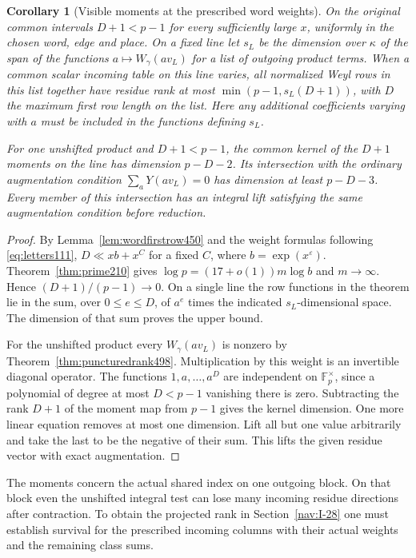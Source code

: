 \documentclass[a4paper,11pt]{article}
\newtheorem{corollary}[proposition]{Corollary}
\theoremstyle{definition}
\theoremstyle{remark}
\numberwithin{equation}{section}
\begin{document}
\begin{corollary}[Visible moments at the prescribed word weights]\leavevmode
\label{cor:orbitkernel500}
On the original common intervals \(D+1<p-1\) for every
sufficiently large \(x\), uniformly in the chosen word, edge
and place. On a fixed line let \(s_L\) be the dimension over
\(\kappa\) of the span of the functions
\(a\mapsto W_\gamma(a v_L)\) for a list of outgoing product
terms. When a common scalar incoming table on this line varies,
all normalized Weyl rows in this list together have residue
rank at most \(\min(p-1,s_L(D+1))\), with \(D\) the maximum
first row length on the list. Here any additional coefficients
varying with \(a\) must be included in the functions defining
\(s_L\).

For one unshifted product and \(D+1<p-1\), the common kernel
of the \(D+1\) moments on the line has dimension \(p-D-2\).
Its intersection with the ordinary augmentation condition
\(\sum_{a}Y(av_L)=0\) has dimension at least \(p-D-3\).
Every member of this intersection has an integral lift satisfying
the same augmentation condition before reduction.
\end{corollary}
\begin{proof}
By Lemma~\ref{lem:wordfirstrow450} and the weight formulas
following \eqref{eq:letters111}, \(D\ll xb+x^C\) for a fixed
\(C\), where \(b=\exp(x^\varepsilon)\). Theorem~\ref{thm:prime210}
gives \(\log p=(17+o(1))m\log b\) and \(m\to\infty\).
Hence \((D+1)/(p-1)\to0\). On a single line the row functions
in the theorem lie in the sum, over \(0\le e\le D\), of
\(a^e\) times the indicated \(s_L\)-dimensional space.
The dimension of that sum proves the upper bound.

For the unshifted product every \(W_\gamma(a v_L)\) is nonzero
by Theorem~\ref{thm:puncturedrank498}. Multiplication by this
weight is an invertible diagonal operator. The functions
\(1,a,\ldots,a^D\) are independent on \(\mathbb F_p^\times\),
since a polynomial of degree at most \(D<p-1\) vanishing there
is zero. Subtracting the rank \(D+1\) of the moment map from
\(p-1\) gives the kernel dimension. One more linear equation removes at
most one dimension. Lift all but one value arbitrarily and take
the last to be the negative of their sum. This lifts the given
residue vector with exact augmentation.
\end{proof}
The moments concern the actual shared index on one outgoing
block. On that block even the unshifted integral test can lose
many incoming residue directions after contraction. To obtain
the projected rank in Section~\ref{nav:I-28} one must establish
survival for the prescribed incoming columns with their actual
weights and the remaining class sums.
\end{document}
